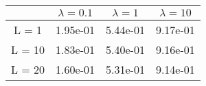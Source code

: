 \begin{tabular}{cccc}
& $\lambda = 0.1$ & $\lambda = 1$ & $\lambda = 10$ \\
\hline
L = 1 & 1.95e-01 & 5.44e-01 & 9.17e-01 \\
L = 10 & 1.83e-01 & 5.40e-01 & 9.16e-01 \\
L = 20 & 1.60e-01 & 5.31e-01 & 9.14e-01 \\
\hline
\end{tabular}
